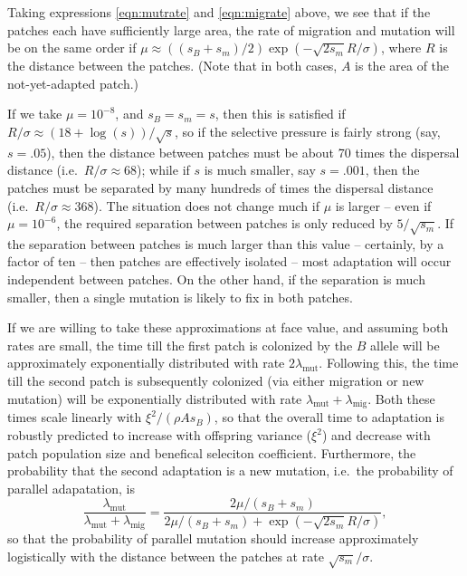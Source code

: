 \documentclass{article}
\newcommand{\migrate}{\lambda_\text{mig}}
\newcommand{\mutrate}{\lambda_\text{mut}}
\begin{document}
Taking expressions \eqref{eqn:mutrate} and \eqref{eqn:migrate} above,
we see that if the patches each have sufficiently large area,
the rate of migration and mutation will be on the same order if 
$\mu \approx ((s_B+s_m)/2) \exp(-\sqrt{2 s_m} R / \sigma)$,
where $R$ is the distance between the patches.
(Note that in both cases, $A$ is the area of the not-yet-adapted patch.)

If we take $\mu = 10^{-8}$, and $s_B=s_m=s$, then this is satisfied if $R/\sigma \approx (18+\log(s))/\sqrt{s}$,
so if the selective pressure is fairly strong (say, $s=.05$),
then the distance between patches must be about 70 times the dispersal distance (i.e.\ $R/\sigma \approx 68$);
while if $s$ is much smaller, say $s = .001$, 
then the patches must be separated by many hundreds of times the dispersal distance (i.e.\ $R/\sigma \approx 368$).
The situation does not change much if $\mu$ is larger -- even if $\mu = 10^{-6}$, 
the required separation between patches is only reduced by $5/\sqrt{s_m}$.
If the separation between patches is much larger than this value -- certainly, by a factor of ten -- 
then patches are effectively isolated -- most adaptation will occur independent between patches.
On the other hand, if the separation is much smaller, then a single
mutation is likely to fix in both patches.

If we are willing to take these approximations at face value, 
and assuming both rates are small, 
the time till the first patch is colonized by the $B$ allele will be approximately exponentially distributed with rate $2 \mutrate$.
Following this, the time till the second patch is subsequently colonized 
(via either migration or new mutation) 
will be exponentially distributed with rate $\mutrate+\migrate$.
Both these times scale linearly with $\xi^2/(\rho A s_{B})$, so that 
the overall time to adaptation is robustly predicted to increase with offspring variance ($\xi^2$)
and decrease with patch population size and benefical seleciton coefficient.
Furthermore, the probability that the second adaptation is a new mutation,
i.e.\ the probability of parallel adapatation, is
\begin{equation}
  \frac{\mutrate}{\mutrate+\migrate} = \frac{2\mu/(s_B+s_m)}{2\mu/(s_B+s_m) + \exp\left(- \sqrt{2 s_m} R / \sigma \right) },
\end{equation}
so that the probability of parallel mutation should increase
approximately logistically with the distance between the patches at rate $\sqrt{s_m} /\sigma$. 
\end{document}
